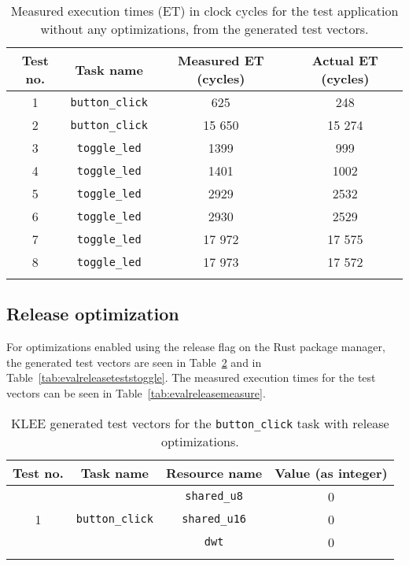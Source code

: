 \begin{longtable}{|c | c | c | c|}
    \hline
    Test no. & Task name & Measured ET (cycles) & Actual ET (cycles) \\ [0.5ex]
    \hline
    1 & \texttt{button\_click} & 625 & 248 \\
    \hline
    2 & \texttt{button\_click} & 15 650 & 15 274 \\
    \hline
    3 & \texttt{toggle\_led} & 1399 & 999  \\
    \hline
    4 & \texttt{toggle\_led} & 1401  & 1002 \\
    \hline
    5 & \texttt{toggle\_led} & 2929  & 2532 \\
    \hline
    6 & \texttt{toggle\_led} & 2930 & 2529 \\
    \hline
    7 & \texttt{toggle\_led} & 17 972 & 17 575 \\
    \hline
    8 & \texttt{toggle\_led} & 17 973 & 17 572 \\
    \hline
\caption{Measured execution times (ET) in clock cycles for the test application without any optimizations, from the generated test vectors.}
\label{tab:evaldebugmeasure}
\end{longtable}

\subsection{Release optimization}
For optimizations enabled using the release flag on the Rust package manager,
the generated test vectors are seen in Table~\ref{tab:evalreleasetestsbutton}
and in Table~\ref{tab:evalreleaseteststoggle}. The measured execution times
for the test vectors can be seen in Table~\ref{tab:evalreleasemeasure}.

\begin{longtable}{|c|c|c|c|}
\hline
Test no. & Task name & Resource name & Value (as integer) \\ \hline
\multirow{3}{*}{1} & \multirow{3}{*}{\texttt{button\_click}} & \texttt{shared\_u8}  & 0 \\ \cline{3-4}
                   &                                         & \texttt{shared\_u16} & 0 \\ \cline{3-4}
                   &                                         & \texttt{dwt}         & 0 \\ \hline
\caption{KLEE generated test vectors for the \texttt{button\_click} task with release optimizations.}
\label{tab:evalreleasetestsbutton}
\end{longtable}

